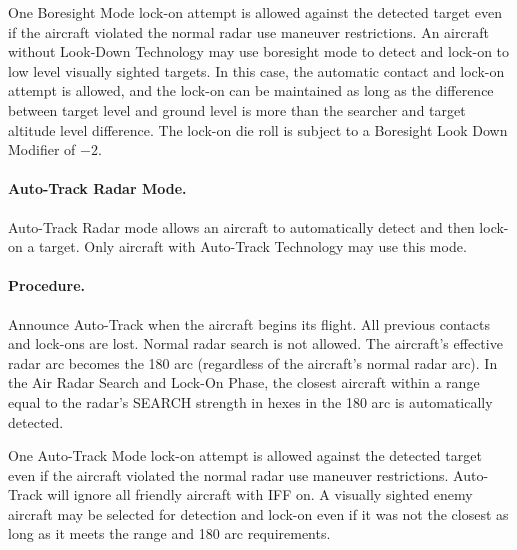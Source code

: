 \begin{advancedrules}
One Boresight Mode lock-on attempt is allowed against the detected target even if the aircraft violated the normal radar use maneuver restrictions. An aircraft without Look-Down Technology may use boresight mode to detect and lock-on to low level visually sighted targets. In this case, the automatic contact and lock-on attempt is allowed, and the lock-on can be maintained as long as the difference between target level and ground level is more than the searcher and target altitude level difference. The lock-on die roll is subject to a Boresight Look Down Modifier of $-2$. 

\label{rule:auto-track-mode}

\paragraph{Auto-Track Radar Mode.} Auto-Track Radar mode allows an aircraft to automatically detect and then lock-on a target. Only aircraft with Auto-Track Technology may use this mode. 

\paragraph{Procedure.} Announce Auto-Track when the aircraft begins its flight. All previous contacts and lock-ons are lost. Normal radar search is not allowed. The aircraft's effective radar arc becomes the 180{\deg} arc (regardless of the aircraft's normal radar arc). In the Air Radar Search and Lock-On Phase, the closest aircraft within a range equal to the radar's SEARCH strength in hexes in the 180{\deg} arc is automatically detected.

One Auto-Track Mode lock-on attempt is allowed against the detected target even if the aircraft violated the normal radar use maneuver restrictions. Auto-Track will ignore all friendly aircraft with IFF on. A visually sighted enemy aircraft may be selected for detection and lock-on even if it was not the closest as long as it meets the range and 180{\deg} arc requirements. 



\end{advancedrules}
